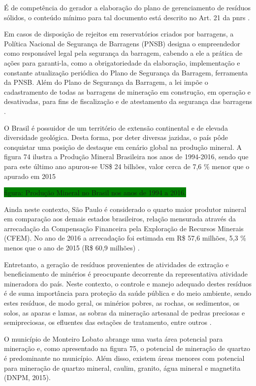 	É de competência do gerador a elaboração do plano de gerenciamento de resíduos sólidos, o conteúdo mínimo para tal documento está descrito no Art. 21 da \gls{pnrs} \cite{brasil:12305}.
	
	Em casos de disposição de rejeitos em reservatórios criados por barragens, a Política Nacional de Segurança de Barragens (PNSB) designa o empreendedor como responsável legal pela segurança da barragem, cabendo a ele a prática de ações para garanti-la, como a obrigatoriedade da elaboração, implementação e constante atualização periódica do Plano de Segurança da Barragem, ferramenta da PNSB. Além do Plano de Segurança da Barragem, a lei impõe o cadastramento de todas as barragens de mineração em construção, em operação e desativadas, para fins de fiscalização e de atestamento da segurança das barragens \cite{brasil:12334}.

	O Brasil é possuidor de um território de extensão continental e de elevada diversidade geológica. Desta forma, por deter diversas jazidas, o país pôde conquistar uma posição de destaque em cenário global na produção mineral. A figura 74 ilustra a Produção Mineral Brasileira nos anos de 1994-2016, sendo que para este último ano apurou-se US\$ 24 bilhões, valor cerca de 7,6 \% menor que o apurado em 2015 %
	
	\colorbox{green}{figura: Produção Mineral no Brasil nos anos de 1994 a 2016.}
	
	Ainda neste contexto, São Paulo é considerado o quarto maior produtor mineral em comparação aos demais estados brasileiros, relação mensurada através da arrecadação da Compensação Financeira pela Exploração de Recursos Minerais (CFEM). No ano de 2016 a arrecadação foi estimada em R\$ 57,6 milhões, 5,3 \% menos que o ano de 2015 (R\$ 60,9 milhões) \cite{informe2016}.

	Entretanto, a geração de resíduos provenientes de atividades de extração e beneficiamento de minérios é preocupante decorrente da representativa atividade mineradora do país. Neste contexto, o controle e manejo adequado destes resíduos é de suma importância para proteção da saúde pública e do meio ambiente, sendo estes resíduos, de modo geral, os minérios pobres, as rochas, os sedimentos, os solos, as aparas e lamas, as sobras da mineração artesanal de pedras preciosas e semipreciosas, os efluentes das estações de tratamento, entre outros \cite{IBRAM2016}. 
	
	O município de Monteiro Lobato abrange uma vasta área potencial para mineração e, como apresentado na figura 75, o potencial de mineração de quartzo é predominante no município. Além disso, existem áreas menores com potencial para mineração de quartzo mineral, caulim, granito, água mineral e magnetita (DNPM, 2015).
	
